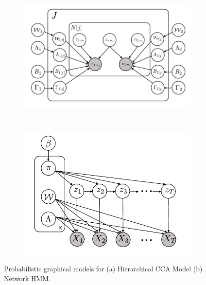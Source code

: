 \documentclass{article}
\begin{document}
\begin{figure}
    \centering
    \begin{subfigure}[b]{0.35\textwidth}
        \includegraphics[width=\textwidth]{CCA.pdf}
        \caption{}
        \label{fig:CCA}
    \end{subfigure}
    ~ %
    \begin{subfigure}[b]{0.35\textwidth}
        \includegraphics[width=\textwidth]{HMM.pdf}
        \caption{}
        \label{fig:HMM}
    \end{subfigure}
    \caption{Probabilistic graphical models for (a) Hierarchical CCA Model (b) Network HMM.}\label{fig:ccaResults}
\end{figure}
\end{document}
